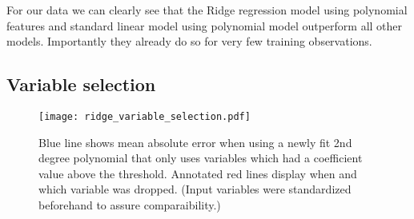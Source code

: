 \documentclass[a4paper, 12pt]{article}
\begin{document}
For our data we can clearly see that the Ridge regression model using polynomial features and standard linear model using polynomial model outperform all other models.
Importantly they already do so for very few training observations.


\subsection{Variable selection}

\begin{figure}[h]
\centering
\texttt{[image: ridge\_variable\_selection.pdf]}
\caption{\small{Blue line shows mean absolute error when using a newly fit 2nd degree polynomial that only uses variables which had a coefficient value above the threshold. Annotated red lines display when and which variable was dropped. (Input variables were standardized beforehand to assure comparaibility.)}}
\end{figure}
\end{document}
